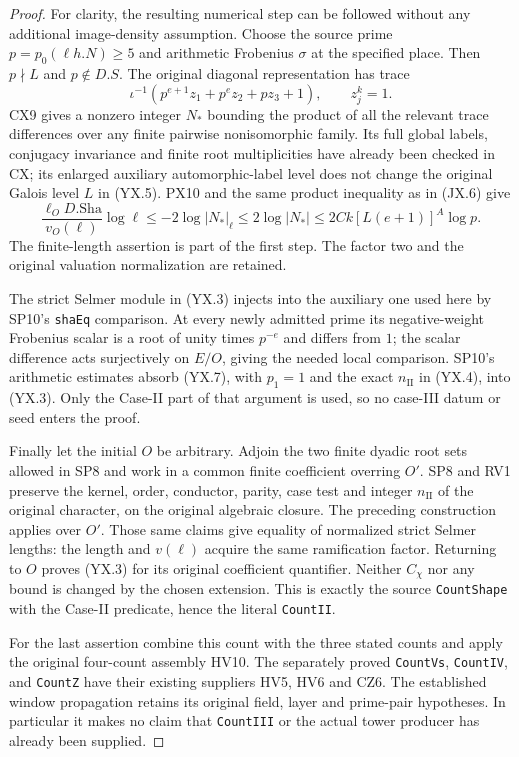 \begin{proof}
For clarity, the resulting numerical step can be followed
without any additional image-density assumption.  Choose the
source prime $p=p_0(\ell h.N)\ge5$ and arithmetic Frobenius
$\sigma$ at the specified place.  Then $p\nmid L$ and
$p\notin D.S$.  The original diagonal representation has trace
\[
       \iota^{-1}(p^{e+1}z_1+p^e z_2+pz_3+1),\qquad z_j^k=1.
                                                               \tag{YX.6}
\]
CX9 gives a nonzero integer $N_*$ bounding the product of all
the relevant trace differences over any finite pairwise
nonisomorphic family.  Its full global labels, conjugacy
invariance and finite root multiplicities have already been
checked in CX; its enlarged auxiliary automorphic-label level
does not change the original Galois level $L$ in (YX.5).
PX10 and the same product inequality as in (JX.6) give
\[
 \frac{\ell_O D.\mathrm{Sha}}{v_O(\ell)}\log\ell
       \le -2\log|N_*|_\ell
       \le 2\log|N_*|
       \le 2Ck[L(e+1)]^A\log p.
                                                               \tag{YX.7}
\]
The finite-length assertion is part of the first step.
The factor two and the original valuation normalization
are retained.

The strict Selmer module in (YX.3) injects into the auxiliary
one used here by SP10's \texttt{shaEq} comparison.
At every newly admitted prime its negative-weight Frobenius
scalar is a root of unity times $p^{-e}$ and differs from $1$;
the scalar difference acts surjectively on $E/O$, giving the
needed local comparison.  SP10's arithmetic estimates absorb
(YX.7), with $p_1=1$ and the exact $n_{\mathrm{II}}$ in
(YX.4), into (YX.3).  Only the Case-II part of that argument
is used, so no case-III datum or seed enters the proof.

Finally let the initial $O$ be arbitrary.  Adjoin the two finite
dyadic root sets allowed in SP8 and work in a common finite
coefficient overring $O'$.  SP8 and RV1 preserve the kernel,
order, conductor, parity, case test and integer $n_{\mathrm{II}}$
of the original character, on the original algebraic closure.
The preceding construction applies over $O'$.  Those same
claims give equality of normalized strict Selmer lengths:
the length and $v(\ell)$ acquire the same ramification factor.
Returning to $O$ proves (YX.3) for its original coefficient
quantifier.  Neither $C_\chi$ nor any bound is changed by the
chosen extension.  This is exactly the source \texttt{CountShape}
with the Case-II predicate, hence the literal \texttt{CountII}.

For the last assertion combine this count with the three
stated counts and apply the original four-count assembly HV10.
The separately proved \texttt{CountVs}, \texttt{CountIV}, and
\texttt{CountZ} have their existing suppliers HV5, HV6 and CZ6.
The established window propagation retains its original field,
layer and prime-pair hypotheses.  In particular it makes no
claim that \texttt{CountIII} or the actual tower producer has
already been supplied.
\end{proof}

